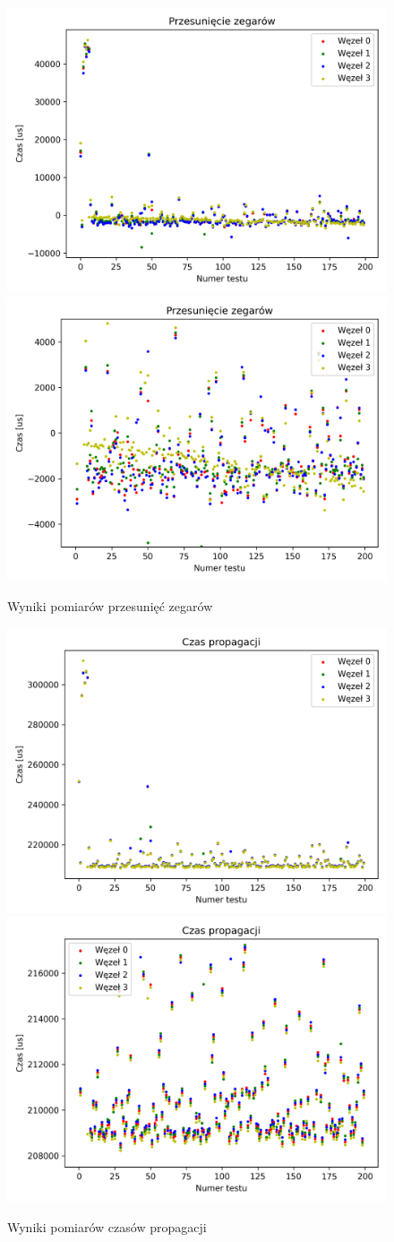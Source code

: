 \begin{figure}[h]
\centering
    \includegraphics[width=.49\textwidth]{pics/ntp_sync/offsets.png}
    \includegraphics[width=.49\textwidth]{pics/ntp_sync/offsets_close.png}
\caption{Wyniki pomiarów przesunięć zegarów}
\label{pic:offsets_ntp}
\end{figure}

\begin{figure}[h]
\centering
    \includegraphics[width=.49\textwidth]{pics/ntp_sync/prop_times.png}
    \includegraphics[width=.49\textwidth]{pics/ntp_sync/prop_times_close.png}
\caption{Wyniki pomiarów czasów propagacji}
\label{pic:prop_times}
\end{figure}

